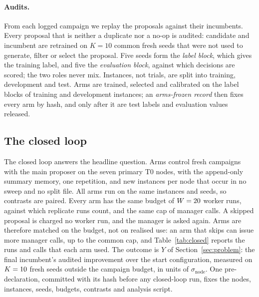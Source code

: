 \paragraph{Audits.}
From each logged campaign we replay the proposals against their incumbents. Every proposal that is neither a duplicate nor a no-op is audited: candidate and incumbent are retrained on $K=10$ common fresh seeds that were not used to generate, filter or select the proposal. Five seeds form the \emph{label block}, which gives the training label, and five the \emph{evaluation block}, against which decisions are scored; the two roles never mix. Instances, not trials, are split into training, development and test. Arms are trained, selected and calibrated on the label blocks of training and development instances; an \emph{arms-frozen record} then fixes every arm by hash, and only after it are test labels and evaluation values released.

\subsection{The closed loop}
\label{sec:setup-closed}

The closed loop answers the headline question. Arms control fresh campaigns with the main proposer on the seven primary T0 nodes, with the append-only summary memory, one repetition, and \LoopInstances{} new instances per node that occur in no sweep and no split file. All arms run on the same instances and seeds, so contrasts are paired. Every arm has the same budget of $W=20$ worker runs, against which replicate runs count, and the same cap of \LoopCalls{} manager calls. A skipped proposal is charged no worker run, and the manager is asked again. Arms are therefore matched on the budget, not on realised use: an arm that skips can issue more manager calls, up to the common cap, and Table~\ref{tab:closed} reports the runs and calls that each arm used. The outcome is $Y$ of Section~\ref{sec:problem}: the final incumbent's audited improvement over the start configuration, measured on $K=10$ fresh seeds outside the campaign budget, in units of $\sigma_{\mathrm{node}}$. One pre-declaration, committed with its hash before any closed-loop run, fixes the nodes, instances, seeds, budgets, contrasts and analysis script. 

